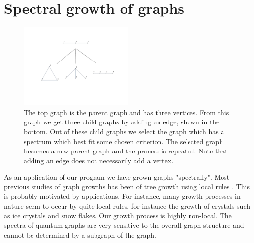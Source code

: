 \documentclass[a4paper]{article}
\begin{document}
\section{Spectral growth of graphs}

\begin{figure}
\centering
\includegraphics[width=0.5\textwidth]{Parent-child.pdf}
\caption{\label{Parent-child:all}The top graph is the parent graph and has three vertices. From this graph we get three child graphs by adding an edge, shown in the bottom. Out of these child graphs we select the graph which has a spectrum which best fit some chosen criterion. The selected graph becomes a new parent graph and the process is repeated. Note that adding an edge does not necessarily add a vertex.}
\end{figure}

As an application of our program we have grown graphs "spectrally". Most previous studies of graph growths has been of tree growth using local rules \cite{vazquez2003growing}. This is probably motivated by applications. For instance, many growth processes in nature seem to occur by quite local rules, for instance the growth of crystals such as ice crystals and snow flakes. Our growth process is highly non-local. The spectra of quantum graphs are very sensitive to the overall graph structure and cannot be determined by a subgraph of the graph.
\end{document}
